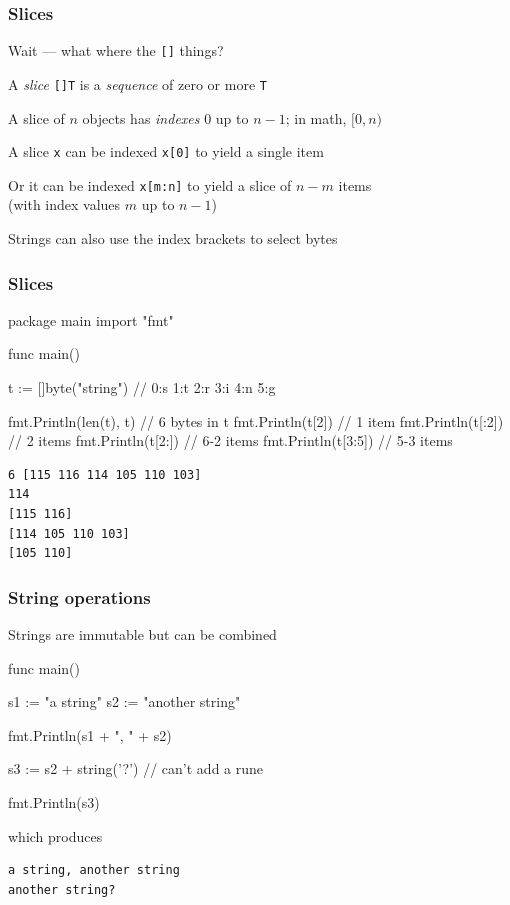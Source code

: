 \documentclass[handout,compress,t,11pt]{beamer}
\begin{document}
\begin{frame}[fragile]
    \frametitle{Slices}
    Wait --- what where the \verb|[]| things? \par
    \vspace{2\baselineskip}
    A {\em slice} \verb|[]T| is a {\em sequence} of zero or more \verb|T| \par
    \vspace{\baselineskip}
    A slice of $n$ objects has {\em indexes} $0$ up to \alert{$n-1$}; in math, \alert{$[0,n)$} \par
    \vspace{\baselineskip}
    A slice \verb|x| can be indexed \verb|x[0]| to yield a single item \par
    \vspace{\baselineskip}
    Or it can be indexed \verb|x[m:n]| to yield a slice of \alert{$n-m$} items \\
    (with index values $m$ up to $n-1$) \par
    \vspace{1.2\baselineskip}
    Strings can also use the index brackets to select bytes \par
\end{frame}

\begin{frame}[fragile]
    \frametitle{Slices}
\begin{golang}
package main
import "fmt"

func main() {
	t := []byte("string")   // 0:s 1:t 2:r 3:i 4:n 5:g

	fmt.Println(len(t), t)  // 6 bytes in t
	fmt.Println(t[2])       //   1 item
	fmt.Println(t[:2])      //   2 items
	fmt.Println(t[2:])      // 6-2 items
	fmt.Println(t[3:5])     // 5-3 items
}
\end{golang}
{\small\begin{verbatim}
6 [115 116 114 105 110 103]
114
[115 116]
[114 105 110 103]
[105 110]
\end{verbatim}}
\end{frame}

\begin{frame}[fragile]
    \frametitle{String operations}
    Strings are immutable but can be combined
\begin{golang}
func main() {
    s1 := "a string"
    s2 := "another string"

    fmt.Println(s1 + ", " + s2)

    s3 := s2 + string('?') // can't add a rune

    fmt.Println(s3)
}
\end{golang}
\vspace{\baselineskip}
which produces
\begin{verbatim}
a string, another string
another string?
\end{verbatim}
\end{frame}
\end{document}
